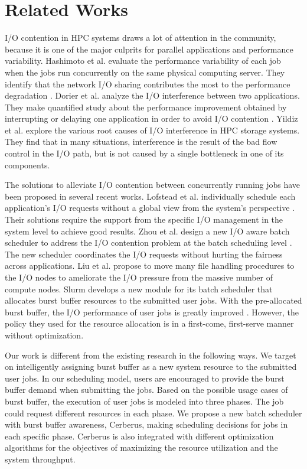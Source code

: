 \section{Related Works}
\label{Sec:RelatedWorks}

I/O contention in HPC systems draws a lot of attention in the community, 
because it is one of the major culprits for parallel applications and performance variability.
Hashimoto et al. evaluate the performance variability of each job 
when the jobs run concurrently on the same physical computing server. 
They identify that the network I/O sharing contributes the most to 
the performance degradation \cite{hashimoto:ICNC:2012}.  
Dorier et al. analyze the I/O interference between two applications. 
They make quantified study about the performance improvement obtained 
by interrupting or delaying one application in order to avoid I/O contention \cite{dorier:IPDPS:2014}.
Yildiz et al. \cite{yildiz:IPDPS:2016} explore the various root causes 
of I/O interference in HPC storage systems. 
They find that in many situations, interference is the result of the bad flow control in the I/O path, but is not caused by a single bottleneck in one of its components.

The solutions to alleviate I/O contention between concurrently 
running jobs have been proposed in several recent works.
Lofstead et al. individually schedule each application's I/O requests without 
a global view from the system's perspective \cite{lofstead:sc:2010}. 
Their solutions require the support from the specific I/O management 
in the system level to achieve good results. 
Zhou et al. design a new I/O aware batch scheduler to address the I/O 
contention problem at the batch scheduling level \cite{zhou:Cluster:2015}. 
The new scheduler coordinates the  I/O requests without hurting the fairness across applications. 
Liu et al. propose to move many file handling procedures to the I/O nodes to 
ameliorate the I/O pressure from the massive number of compute nodes\cite{Liu:MSST:2012}.
Slurm develops a new module for its batch scheduler that allocates burst buffer 
resources to the submitted user jobs. With the pre-allocated burst buffer, 
the I/O performance of user jobs is greatly improved \cite{SlurmBBGuide}.
However, the policy they used for the resource allocation is in a first-come, first-serve manner without optimization. 

Our work is different from the existing research in the following ways. 
We target on intelligently assigning burst buffer as a new system resource to the submitted user jobs.
In our scheduling model, users are encouraged to provide the burst buffer demand when submitting the jobs.
Based on the possible usage cases of burst buffer, the execution of user jobs is modeled into three phases. 
The job could request different resources in each phase.
We propose a new batch scheduler with burst buffer awareness, Cerberus, 
making scheduling decisions for jobs in each specific phase.
Cerberus is also integrated with different optimization algorithms for the objectives of maximizing the resource utilization and the system throughput.




